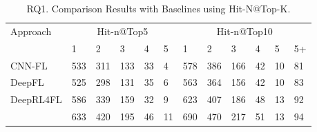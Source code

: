 \begin{table}[t]
	\caption{RQ1. Comparison Results with Baselines using Hit-N@Top-K.}
	{\small
		\begin{center}
			\renewcommand{\arraystretch}{1}
			\begin{tabular}{p{1.5cm}<{\centering}|p{0.3cm}<{\centering}|p{0.3cm}<{\centering}|p{0.3cm}<{\centering}|p{0.2cm}<{\centering}|p{0.2cm}<{\centering}|p{0.3cm}<{\centering}|p{0.3cm}<{\centering}|p{0.3cm}<{\centering}|p{0.2cm}<{\centering}|p{0.2cm}<{\centering}|p{0.2cm}<{\centering}}
				\hline
				\multirow{2}{*}{Approach}    & \multicolumn{5}{c|}{Hit-n@Top5}& \multicolumn{6}{c}{Hit-n@Top10}\\
				\cline{2-12}
											 &1&2&3&4&5&1&2&3&4&5&5+\\
				
				\hline
				CNN-FL      & 533 & 311 & 133 & 33 & 4 & 578 & 386 & 166 & 42 & 10 & 81 \\
				DeepFL		& 525 & 298 & 131 & 35 & 6 & 563 & 364 & 156 & 42 & 10 & 83 \\
				DeepRL4FL	& 586 & 339 & 159 & 32 & 9 & 623 & 407 & 186 & 48 & 13 & 92 \\
				\hline
				\tool       & 633 & 420 & 195 & 46 & 11& 690 & 470 & 217 & 51 & 13 & 94 \\
				\hline
			\end{tabular}
			
			\label{fig:rq1-2}
		\end{center}
	}
\end{table}
